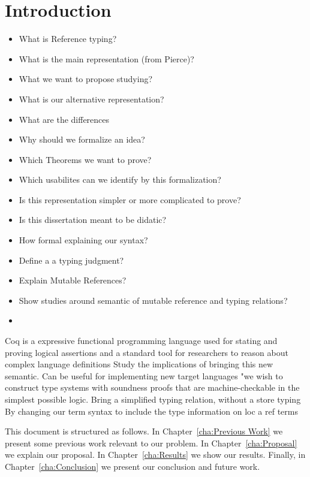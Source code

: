 
\chapter{Introduction}
\begin{itemize}
    \color{red}
    \item What is Reference typing?
    \item What is the main representation (from Pierce)?
    \item What we want to propose studying?
    \item What is our alternative representation?
    \item What are the differences
    \item Why should we formalize an idea?
    \item Which Theorems we want to prove?
    \item Which usabilites can we identify by this formalization?
    \item Is this representation simpler or more complicated to prove?
    \item Is this dissertation meant to be didatic?
    \item How formal explaining our syntax?
    \item Define a a typing judgment?
    \item Explain Mutable References?
    \item Show studies around semantic of mutable reference and typing relations?
    \item  
\end{itemize}
Coq is a expressive functional programming language used for stating and proving logical assertions and a standard tool for researchers to reason about complex language definitions \cite{Pierce_SF1}
Study the implications of bringing this new semantic.
Can be useful for implementing new target languages
"we wish to construct type systems with soundness proofs
that are machine-checkable in the simplest possible logic.
Bring a simplified typing relation, without a store typing
By changing our term syntax to include the type information on loc a ref terms


This document is structured as follows. In Chapter~\ref{cha:Previous Work} we present some previous work relevant to our problem. In Chapter~\ref{cha:Proposal} we explain our proposal. In Chapter~\ref{cha:Results} we show our results. Finally, in Chapter~\ref{cha:Conclusion} we present our conclusion and future work.


